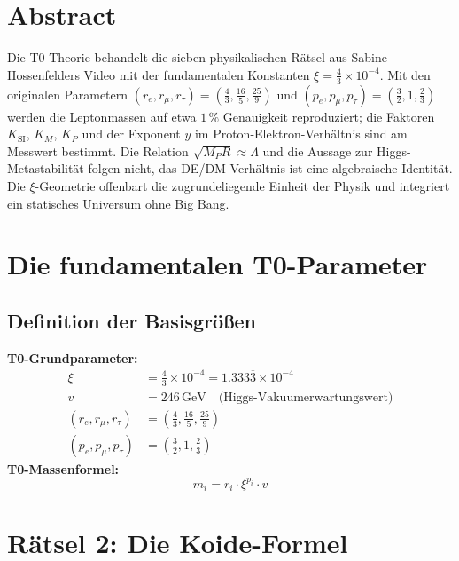 \section*{Abstract}
		Die T0-Theorie behandelt die sieben physikalischen Rätsel aus Sabine Hossenfelders Video mit der fundamentalen Konstanten $\xi = \frac{4}{3} \times 10^{-4}$. Mit den originalen Parametern $(r_e, r_\mu, r_\tau) = (\frac{4}{3}, \frac{16}{5}, \frac{25}{9})$ und $(p_e, p_\mu, p_\tau) = (\frac{3}{2}, 1, \frac{2}{3})$ werden die Leptonmassen auf etwa $1\,\%$ Genauigkeit reproduziert; die Faktoren $K_{\text{SI}}$, $K_M$, $K_P$ und der Exponent $y$ im Proton-Elektron-Verhältnis sind am Messwert bestimmt. Die Relation $\sqrt{M_P R} \approx \Lambda$ und die Aussage zur Higgs-Metastabilität folgen nicht, das DE/DM-Verhältnis ist eine algebraische Identität. Die $\xi$-Geometrie offenbart die zugrundeliegende Einheit der Physik und integriert ein statisches Universum ohne Big Bang.

	\section{Die fundamentalen T0-Parameter}
	\subsection{Definition der Basisgrößen}
	\textbf{T0-Grundparameter:}
	\begin{align}
		\xi &= \frac{4}{3} \times 10^{-4} = 1.333\overline{3} \times 10^{-4} \\
		v &= 246\,\si{\giga\electronvolt} \quad \text{(Higgs-Vakuumerwartungswert)} \\
		(r_e, r_\mu, r_\tau) &= \left(\frac{4}{3}, \frac{16}{5}, \frac{25}{9}\right) \\
		(p_e, p_\mu, p_\tau) &= \left(\frac{3}{2}, 1, \frac{2}{3}\right)
	\end{align}
	\textbf{T0-Massenformel:}
	\begin{equation}
		m_i = r_i \cdot \xi^{p_i} \cdot v
	\end{equation}
	\section{Rätsel 2: Die Koide-Formel}
